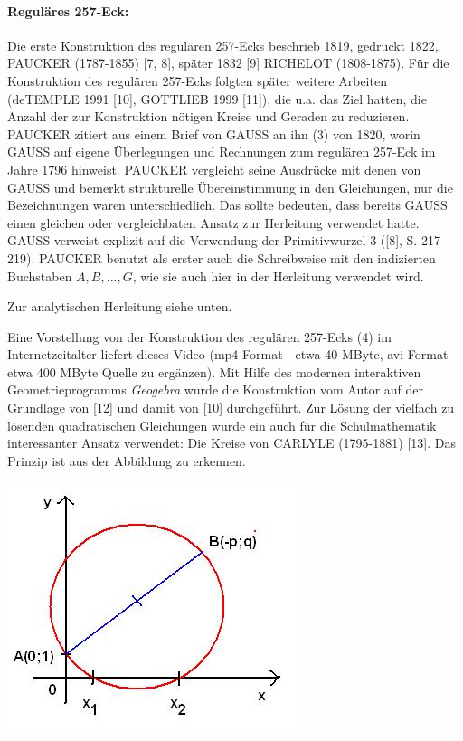 \documentclass[11pt]{article}
\begin{document}
\paragraph{Reguläres 257-Eck:}
Die erste Konstruktion des regulären 257-Ecks beschrieb 1819, gedruckt 1822,
PAUCKER (1787-1855) [7, 8], später 1832 [9] RICHELOT (1808-1875). Für die
Konstruktion des regulären 257-Ecks folgten später weitere Arbeiten (deTEMPLE
1991 [10], GOTTLIEB 1999 [11]), die u.a. das Ziel hatten, die Anzahl der zur
Konstruktion nötigen Kreise und Geraden zu reduzieren. PAUCKER zitiert aus
einem Brief von GAUSS an ihn (3) von 1820, worin GAUSS auf eigene Überlegungen
und Rechnungen zum regulären 257-Eck im Jahre 1796 hinweist. PAUCKER
vergleicht seine Ausdrücke mit denen von GAUSS und bemerkt strukturelle
Übereinstimmung in den Gleichungen, nur die Bezeichnungen waren
unterschiedlich. Das sollte bedeuten, dass bereits GAUSS einen gleichen oder
vergleichbaten Ansatz zur Herleitung verwendet hatte. GAUSS verweist explizit
auf die Verwendung der Primitivwurzel 3 ([8], S. 217-219). PAUCKER benutzt als
erster auch die Schreibweise mit den indizierten Buchstaben $A, B, ..., G$,
wie sie auch hier in der Herleitung verwendet wird.

Zur analytischen Herleitung siehe unten.

Eine Vorstellung von der Konstruktion des regulären 257-Ecks (4) im
Internetzeitalter liefert dieses Video (mp4-Format - etwa 40 MByte, avi-Format
- etwa 400 MByte Quelle zu ergänzen). Mit Hilfe des modernen interaktiven
Geometrieprogramms \emph{Geogebra} wurde die Konstruktion vom Autor auf der
Grundlage von [12] und damit von [10] durchgeführt. Zur Lösung der vielfach zu
lösenden quadratischen Gleichungen wurde ein auch für die Schulmathematik
interessanter Ansatz verwendet: Die Kreise von CARLYLE (1795-1881) [13]. Das
Prinzip ist aus der Abbildung zu erkennen.

\begin{center}
  \includegraphics[width=.7\textwidth]{CarlyleKreis.jpg}
\end{center}
\end{document}
